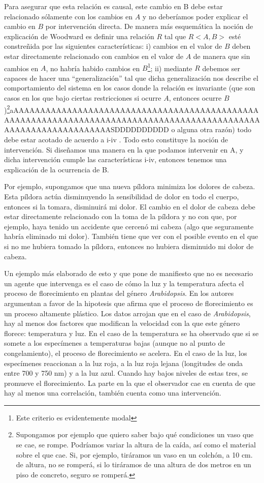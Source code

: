 Para asegurar que esta relación es causal, este cambio en B debe estar relacionado sólamente con los cambios en $A$ y no deberíamos poder explicar el cambio en $B$ por intervención directa. De manera más esquemática la noción de explicación de Woodward es definir una relación $R$ tal que $R<A, B>$ esté constreñida por las siguientes características: i) cambios en el valor de $B$ deben estar directamente relacionado con cambios en el valor de $A$ de manera que sin cambios en $A$, no habría habido cambios en $B$\footnote{Este criterio es evidentemente modal}; ii) mediante $R$ debemos ser capaces de hacer una ``generalización'' tal que dicha generalización nos describe el comportamiento del sistema en los casos donde la relación es invariante (que son casos en los que bajo ciertas restricciones si ocurre $A$, entonces ocurre $B$)\footnote{Supongamos por ejemplo que quiero saber bajo qué condiciones un vaso que se cae, se rompe. Podríamos variar la altura de la caída, así como el material sobre el que cae. Si, por ejemplo, tiráramos un vaso en un colchón, a 10 cm. de altura, no se romperá, si lo tiráramos de una altura de dos metros en un piso de concreto, seguro se romperá. }aAAAAAAAAAAAAAAAAAAAAAAAAAAAAAAAAAAAAAAAAAAAAAAAAAAAAAAAAAAAAAAAAAAAAAAAAAAAAAAAAAAAAAAAAAAAAAAAAAAAAAAAAAAAAAAAAAASDDDDDDDDDD o alguna otra razón) todo debe estar acotado de acuerdo a i-iv \cite[p. 201]{Woodward2000}. Todo esto constituye la noción de intervención. Si diseñamos una manera en la que podamos intervenir en  A, y dicha intervención cumple las características i-iv, entonces tenemos una explicación de la ocurrencia de B.

Por ejemplo, supongamos que una nueva píldora minimiza los dolores de cabeza. Esta píldora actúa disminuyendo la sensibilidad de dolor en todo el cuerpo, entonces si la tomara, disminuirá mi dolor. El cambio en el dolor de cabeza debe estar directamente relacionado con la toma de la píldora y no con que, por ejemplo, haya tenido un accidente que cercenó mi cabeza (algo que seguramente habría eliminado mi dolor). También tiene que ver con el posible evento en el que si no me hubiera tomado la píldora, entonces no hubiera disminuido mi dolor de cabeza.

Un ejemplo más elaborado de esto y que pone de manifiesto que no es necesario un agente que intervenga es el caso de cómo la luz y la temperatura afecta el proceso de florecimiento en plantas del género \emph{Arabidopsis}. En \cite{AusinEnviro} los autores argumentan a favor de la hipotesis que afirma que el proceso de florecimiento es un proceso altamente plástico. Los datos arrojan que en el caso de \emph{Arabidopsis}, hay al menos dos factores que modifican la velocidad con la que este género florece: temperatura y luz. En el caso de la temperatura se ha observado que si se somete a los especímenes a temperaturas bajas (aunque no al punto de congelamiento), el proceso de florecimiento se acelera. En el caso de la luz, los especímenes reaccionan a la luz roja, a la luz roja lejana (longitudes de onda entre 700 y 750 nm) y a la luz azul. Cuando hay bajos niveles de estas tres, se promueve el florecimiento. La parte en la que el observador cae en cuenta de que hay al menos una correlación, también cuenta como una intervención.

